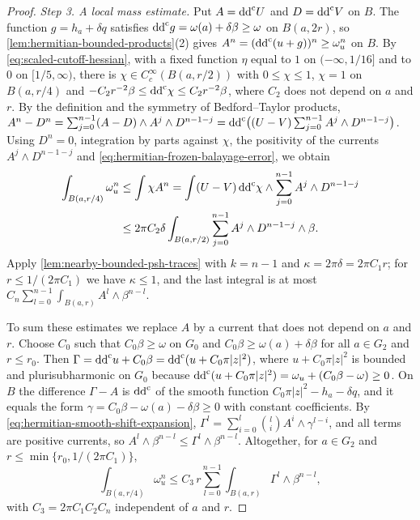 \begin{proof}
\emph{Step 3. A local mass estimate.} Put $A=\mathrm{dd}^{\mathrm{c}} U$ and $D=\mathrm{dd}^{\mathrm{c}} V$ on $B$. The function $g=h_a+\delta q$ satisfies $\mathrm{dd}^{\mathrm{c}} g=\omega(a)+\delta\beta\geq\omega$ on $B(a,2r)$, so \cref{lem:hermitian-bounded-products}(2) gives $A^n=(\mathrm{dd}^{\mathrm{c}}(u+g))^n\geq\omega_u^n$ on $B$. By \eqref{eq:scaled-cutoff-hessian}, with a fixed function $\eta$ equal to $1$ on $(-\infty,1/16]$ and to $0$ on $[1/5,\infty)$, there is $\chi\in C^\infty_c(B(a,r/2))$ with $0\leq\chi\leq1$, $\chi=1$ on $B(a,r/4)$ and $-C_2r^{-2}\beta\leq\mathrm{dd}^{\mathrm{c}}\chi\leq C_2r^{-2}\beta$, where $C_2$ does not depend on $a$ and $r$. By the definition and the symmetry of Bedford--Taylor products, $A^n-D^n=\sum_{j=0}^{n-1}(A-D)\wedge A^j\wedge D^{n-1-j}=\mathrm{dd}^{\mathrm{c}}\bigl((U-V)\sum_{j=0}^{n-1}A^j\wedge D^{n-1-j}\bigr)$. Using $D^n=0$, integration by parts against $\chi$, the positivity of the currents $A^j\wedge D^{n-1-j}$ and \eqref{eq:hermitian-frozen-balayage-error}, we obtain
\[
 \begin{aligned}
 \int_{B(a,r/4)}\omega_u^n
 &\leq\int\chi A^n
 =\int(U-V)\,\mathrm{dd}^{\mathrm{c}}\chi\wedge\sum_{j=0}^{n-1}A^j\wedge D^{n-1-j}\\
 &\leq2\pi C_2\delta\int_{B(a,r/2)}
                   \sum_{j=0}^{n-1}A^j\wedge D^{n-1-j}\wedge\beta.
 \end{aligned}
\]
Apply \cref{lem:nearby-bounded-psh-traces} with $k=n-1$ and $\kappa=2\pi\delta=2\pi C_1r$; for $r\leq1/(2\pi C_1)$ we have $\kappa\leq1$, and the last integral is at most $C_n\sum_{l=0}^{n-1}\int_{B(a,r)}A^l\wedge\beta^{n-l}$.

To sum these estimates we replace $A$ by a current that does not depend on $a$ and $r$. Choose $C_0$ such that $C_0\beta\geq\omega$ on $G_0$ and $C_0\beta\geq\omega(a)+\delta\beta$ for all $a\in G_2$ and $r\leq r_0$. Then $\Gamma=\mathrm{dd}^{\mathrm{c}} u+C_0\beta=\mathrm{dd}^{\mathrm{c}}(u+C_0\pi|z|^2)$, where $u+C_0\pi|z|^2$ is bounded and plurisubharmonic on $G_0$ because $\mathrm{dd}^{\mathrm{c}}(u+C_0\pi|z|^2)=\omega_u+(C_0\beta-\omega)\geq0$. On $B$ the difference $\Gamma-A$ is $\mathrm{dd}^{\mathrm{c}}$ of the smooth function $C_0\pi|z|^2-h_a-\delta q$, and it equals the form $\gamma=C_0\beta-\omega(a)-\delta\beta\geq0$ with constant coefficients. By \eqref{eq:hermitian-smooth-shift-expansion}, $\Gamma^l=\sum_{i=0}^l\binom liA^i\wedge\gamma^{l-i}$, and all terms are positive currents, so $A^l\wedge\beta^{n-l}\leq\Gamma^l\wedge\beta^{n-l}$. Altogether, for $a\in G_2$ and $r\leq\min\{r_0,1/(2\pi C_1)\}$,
\[
 \int_{B(a,r/4)}\omega_u^n\leq C_3\,r\sum_{l=0}^{n-1}\int_{B(a,r)}\Gamma^l\wedge\beta^{n-l},
\]
with $C_3=2\pi C_1C_2C_n$ independent of $a$ and $r$.


\end{proof}
